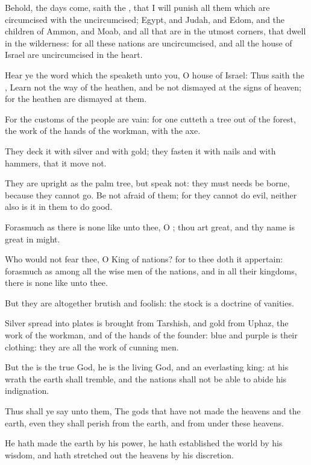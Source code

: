 \Verse Behold, the days come, saith the \LORD, that I will punish all them which are circumcised with the uncircumcised; \Verse Egypt, and Judah, and Edom, and the children of Ammon, and Moab, and all that are in the utmost corners, that dwell in the wilderness: for all these nations are uncircumcised, and all the house of Israel are uncircumcised in the heart.


\Chapter
\Verse Hear ye the word which the \LORD speaketh unto you, O house of Israel: \Verse Thus saith the \LORD, Learn not the way of the heathen, and be not dismayed at the signs of heaven; for the heathen are dismayed at them.

\Verse For the customs of the people are vain: for one cutteth a tree out of the forest, the work of the hands of the workman, with the axe.

\Verse They deck it with silver and with gold; they fasten it with nails and with hammers, that it move not.

\Verse They are upright as the palm tree, but speak not: they must needs be borne, because they cannot go. Be not afraid of them; for they cannot do evil, neither also is it in them to do good.

\Verse Forasmuch as there is none like unto thee, O \LORD; thou art great, and thy name is great in might.

\Verse Who would not fear thee, O King of nations? for to thee doth it appertain: forasmuch as among all the wise men of the nations, and in all their kingdoms, there is none like unto thee.

\Verse But they are altogether brutish and foolish: the stock is a doctrine of vanities.

\Verse Silver spread into plates is brought from Tarshish, and gold from Uphaz, the work of the workman, and of the hands of the founder: blue and purple is their clothing: they are all the work of cunning men.

\Verse But the \LORD is the true God, he is the living God, and an everlasting king: at his wrath the earth shall tremble, and the nations shall not be able to abide his indignation.

\Verse Thus shall ye say unto them, The gods that have not made the heavens and the earth, even they shall perish from the earth, and from under these heavens.

\Verse He hath made the earth by his power, he hath established the world by his wisdom, and hath stretched out the heavens by his discretion.

